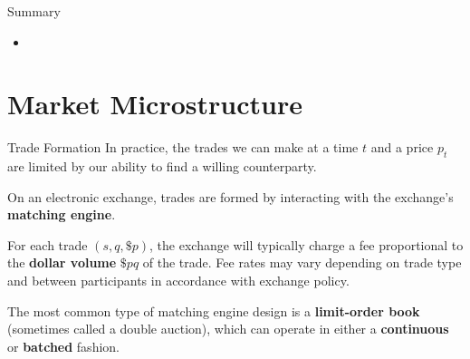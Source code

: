\documentclass{beamer}
\begin{document}
\begin{frame}{Summary}
	\begin{itemize}
		\item 
	\end{itemize}
\end{frame}

\section{Market Microstructure}
\begin{frame}{Trade Formation}
	In practice, the trades we can make at a time $t$ and a price $p_t$ are limited by our ability to find a willing counterparty.

	On an electronic exchange, trades are formed by interacting with the exchange's \textbf{matching engine}.%

	For each trade $(s,q,\$p)$, the exchange will typically charge a fee proportional to the \textbf{dollar volume} $\$pq$ of the trade. Fee rates may vary depending on trade type and between participants in accordance with exchange policy.

	The most common type of matching engine design is a \textbf{limit-order book} (sometimes called a double auction), which can operate in either a \textbf{continuous} or \textbf{batched} fashion.
\end{frame}
\end{document}
